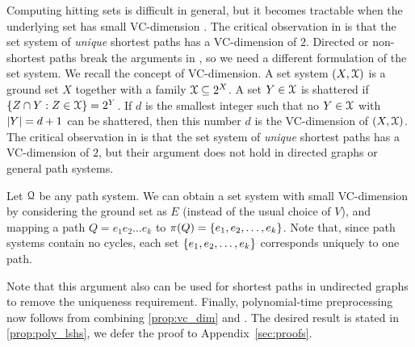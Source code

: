 Computing hitting sets is difficult in general, but it becomes tractable when the underlying set has small VC-dimension \cite{vc_dim_hitting}.
The critical observation in \cite{hd_journal} is that the set system of \emph{unique} shortest paths has a VC-dimension of $2$.
Directed or non-shortest paths break the arguments in \cite{hd_journal}, so we need a different formulation of the set system.
We recall the concept of VC-dimension.
A set system $(X,\mathcal{X})$ is a ground set $X$ together with a family $\mathcal{X}\subseteq 2^X$.
A set $Y\in \mathcal{X}$ is shattered if $\{Z\cap Y:Z\in\mathcal{X}\}=2^Y$.
If $d$ is the smallest integer such that no $Y\in\mathcal{X}$ with $\lvert Y\rvert=d+1$ can be shattered, then this number $d$ is the VC-dimension of $(X,\mathcal{X})$.
The critical observation in \cite{hd_journal} is that the set system of \emph{unique} shortest paths has a VC-dimension of $2$, but their argument does not hold in directed graphs or general path systems.

Let $\mathcal{Q}$ be any path system.
We can obtain a set system with small VC-dimension by considering the ground set as $E$ (instead of the usual choice of $V$), and mapping a path $Q=e_1e_2\ldots e_k$ to $\pi(Q)=\{e_1,e_2,\ldots,e_k\}$.
Note that, since path systems contain no cycles, each set $\{e_1,e_2,\ldots,e_k\}$ corresponds uniquely to one path.
Note that this argument also can be used for shortest paths in undirected graphs to remove the uniqueness requirement.
Finally, polynomial-time preprocessing now follows from combining \cref{prop:vc_dim} and \cite{vc_dim_hitting}.
The desired result is stated in \cref{prop:poly_lshs}, we defer the proof to Appendix~\ref{sec:proofs}.

